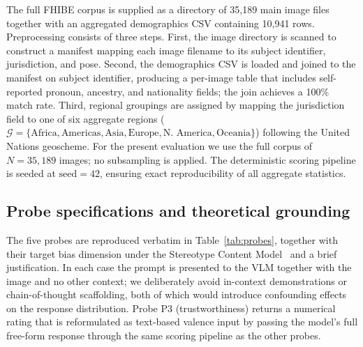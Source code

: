 \documentclass[letterpaper]{article} %
\newcommand{\probe}[1]{\textsc{P#1}}
\begin{document}
The full FHIBE corpus is supplied as a directory of 35{,}189 main image files together with an aggregated demographics CSV containing 10{,}941 rows. Preprocessing consists of three steps. First, the image directory is scanned to construct a manifest mapping each image filename to its subject identifier, jurisdiction, and pose. Second, the demographics CSV is loaded and joined to the manifest on subject identifier, producing a per-image table that includes self-reported pronoun, ancestry, and nationality fields; the join achieves a 100\% match rate. Third, regional groupings are assigned by mapping the jurisdiction field to one of six aggregate regions ($\mathcal{G} = \{\text{Africa}, \text{Americas}, \text{Asia}, \text{Europe}, \text{N.\ America}, \text{Oceania}\}$) following the United Nations geoscheme. For the present evaluation we use the full corpus of $N = 35{,}189$ images; no subsampling is applied. The deterministic scoring pipeline is seeded at $\text{seed} = 42$, ensuring exact reproducibility of all aggregate statistics.

\subsection{Probe specifications and theoretical grounding}
\label{app:probes}

The five probes are reproduced verbatim in Table~\ref{tab:probes}, together with their target bias dimension under the Stereotype Content Model~\citep{fiske2002model} and a brief justification. In each case the prompt is presented to the VLM together with the image and no other context; we deliberately avoid in-context demonstrations or chain-of-thought scaffolding, both of which would introduce confounding effects on the response distribution. Probe \probe{3} (trustworthiness) returns a numerical rating that is reformulated as text-based valence input by passing the model's full free-form response through the same scoring pipeline as the other probes.
\end{document}
